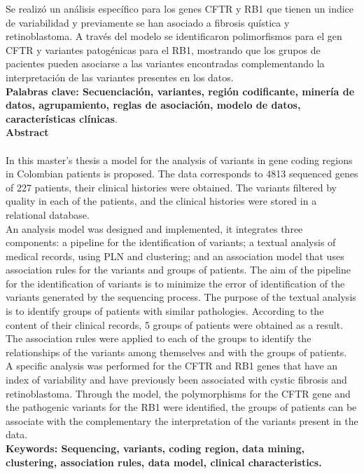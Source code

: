 Se realizó un análisis específico para los genes CFTR y RB1 que tienen un indice de variabilidad y previamente se han asociado a fibrosis quística y retinoblastoma. A través del modelo se identificaron polimorfismos para el gen CFTR y variantes patogénicas para el RB1, mostrando que los grupos de pacientes pueden asociarse  a las variantes encontradas complementando la interpretación de las variantes presentes en los datos.   \\

\textbf{\small Palabras clave: Secuenciación, variantes, región codificante, minería de datos, agrupamiento, reglas de asociación, modelo de datos, características clínicas}.\\


\textbf{\LARGE Abstract}\\\\
In this master's thesis a model for the analysis of variants in gene coding regions in Colombian patients is proposed. The data corresponds to 4813 sequenced genes of 227 patients, their clinical histories were obtained. The variants filtered by quality in each of the patients, and the clinical histories were stored in a relational database. \\

An analysis model was designed and implemented, it integrates three components: a pipeline for the identification of variants; a textual analysis of medical records, using PLN and clustering; and an association model that uses association rules for the variants and groups of patients. The aim of the pipeline for the identification of variants is to minimize the error of identification of the variants generated by the sequencing process. The purpose of the textual analysis is to identify groups of patients with similar pathologies. According to the content of their clinical records, 5 groups of patients were obtained as a result. The association rules were applied to each of the groups to identify the relationships of the variants among themselves and with the groups of patients. \\

A specific analysis was performed for the CFTR and RB1 genes that have an index of variability and have previously been associated with cystic fibrosis and retinoblastoma. Through the model, the polymorphisms for the CFTR gene and the pathogenic variants for the RB1 were identified, the groups of patients can  be associate with the complementary  the interpretation of the variants present in the data. \\


\textbf{\small Keywords: Sequencing, variants, coding region, data mining, clustering, association rules, data model, clinical characteristics.}\\